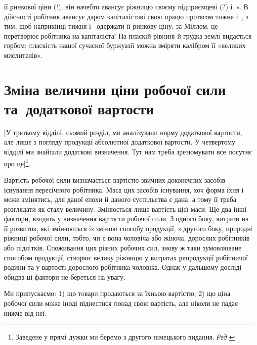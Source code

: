 \parcont{}  %
її ринкової ціни (!), він начебто авансує ріжницю своєму підприємцеві
(?) і~». В дійсності робітник авансує даром
капіталістові свою працю протягом тижня і~, з тим, щоб
наприкінці тижня і~ одержати її ринкову ціну; за Міллом,
це перетворює робітника на капіталіста! На пласкій рівнині
й грудка землі видається горбом; пласкість нашої сучасної буржуазії
можна зміряти калібром її «великих мислителів».

\section{Зміна величини ціни робочої сили та~додаткової
вартости}

[У третьому відділі, сьомий розділ, ми аналізували норму
додаткової вартости, але лише з погляду продукції абсолютної
додаткової вартости. У четвертому відділі ми знайшли додаткові
визначення. Тут нам треба зрезюмувати все посутнє про це]\footnote*{
Заведене у прямі дужки ми беремо з другого німецького видання.
\emph{Ред.}
}.

Вартість робочої сили визначається вартістю звичних доконечних
засобів існування пересічного робітника. Маса цих засобів
існування, хоч форма їхня і може змінятись, для даної епохи
й даного суспільства є дана, а тому її треба розглядати як сталу
величину. Змінюється лише вартість цієї маси. Ще два інші
фактори, входять у визначення вартости робочої сили. З одного
боку, витрати на її розвиток, які змінюються із зміною способу
продукції, з другого боку, природні ріжниці робочої сили, тобто,
чи є вона чоловіча або жіноча, дорослих робітників або підлітків.
Споживання цих різних робочих сил, знову ж таки зумовлюване
способом продукції, створює велику ріжницю у витратах репродукції
робітничої родини та у вартості дорослого робітника-чоловіка.
Однак у дальшому досліді обидва ці фактори не береться
на увагу.

Ми припускаємо: 1) що товари продаються за їхньою вартістю;
2) що ціна робочої сили може іноді піднестися понад свою вартість,
але ніколи не падає нижче від неї.


